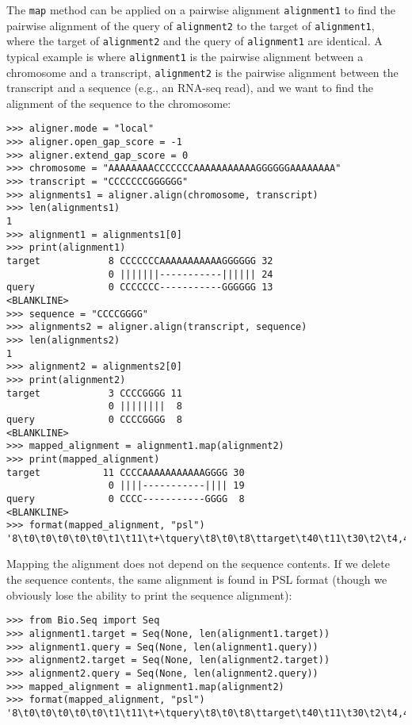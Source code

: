 The \verb+map+ method can be applied on a pairwise alignment \verb+alignment1+ to find the pairwise alignment of the query of \verb+alignment2+ to the target of \verb+alignment1+, where the target of \verb+alignment2+ and the query of \verb+alignment1+ are identical. A typical example is where \verb+alignment1+ is the pairwise alignment between a chromosome and a transcript, \verb+alignment2+ is the pairwise alignment between the transcript and a sequence (e.g., an RNA-seq read), and we want to find the alignment of the sequence to the chromosome:

\begin{verbatim}
>>> aligner.mode = "local"
>>> aligner.open_gap_score = -1
>>> aligner.extend_gap_score = 0
>>> chromosome = "AAAAAAAACCCCCCCAAAAAAAAAAAGGGGGGAAAAAAAA"
>>> transcript = "CCCCCCCGGGGGG"
>>> alignments1 = aligner.align(chromosome, transcript)
>>> len(alignments1)
1
>>> alignment1 = alignments1[0]
>>> print(alignment1)
target            8 CCCCCCCAAAAAAAAAAAGGGGGG 32
                  0 |||||||-----------|||||| 24
query             0 CCCCCCC-----------GGGGGG 13
<BLANKLINE>
>>> sequence = "CCCCGGGG"
>>> alignments2 = aligner.align(transcript, sequence)
>>> len(alignments2)
1
>>> alignment2 = alignments2[0]
>>> print(alignment2)
target            3 CCCCGGGG 11
                  0 ||||||||  8
query             0 CCCCGGGG  8
<BLANKLINE>
>>> mapped_alignment = alignment1.map(alignment2)
>>> print(mapped_alignment)
target           11 CCCCAAAAAAAAAAAGGGG 30
                  0 ||||-----------|||| 19
query             0 CCCC-----------GGGG  8
<BLANKLINE>
>>> format(mapped_alignment, "psl")
'8\t0\t0\t0\t0\t0\t1\t11\t+\tquery\t8\t0\t8\ttarget\t40\t11\t30\t2\t4,4,\t0,4,\t11,26,\n'
\end{verbatim}

Mapping the alignment does not depend on the sequence contents. If we delete
the sequence contents, the same alignment is found in PSL format (though we
obviously lose the ability to print the sequence alignment):

\begin{verbatim}
>>> from Bio.Seq import Seq
>>> alignment1.target = Seq(None, len(alignment1.target))
>>> alignment1.query = Seq(None, len(alignment1.query))
>>> alignment2.target = Seq(None, len(alignment2.target))
>>> alignment2.query = Seq(None, len(alignment2.query))
>>> mapped_alignment = alignment1.map(alignment2)
>>> format(mapped_alignment, "psl")
'8\t0\t0\t0\t0\t0\t1\t11\t+\tquery\t8\t0\t8\ttarget\t40\t11\t30\t2\t4,4,\t0,4,\t11,26,\n'
\end{verbatim}

